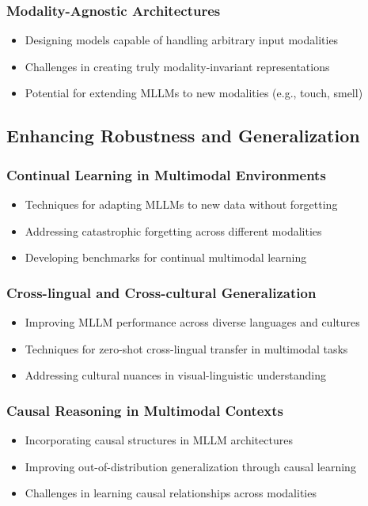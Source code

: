\subsubsection{Modality-Agnostic Architectures}
\begin{itemize}
    \item Designing models capable of handling arbitrary input modalities
    \item Challenges in creating truly modality-invariant representations
    \item Potential for extending MLLMs to new modalities (e.g., touch, smell)
\end{itemize}

\subsection{Enhancing Robustness and Generalization}
\subsubsection{Continual Learning in Multimodal Environments}
\begin{itemize}
    \item Techniques for adapting MLLMs to new data without forgetting
    \item Addressing catastrophic forgetting across different modalities
    \item Developing benchmarks for continual multimodal learning
\end{itemize}

\subsubsection{Cross-lingual and Cross-cultural Generalization}
\begin{itemize}
    \item Improving MLLM performance across diverse languages and cultures
    \item Techniques for zero-shot cross-lingual transfer in multimodal tasks
    \item Addressing cultural nuances in visual-linguistic understanding
\end{itemize}

\subsubsection{Causal Reasoning in Multimodal Contexts}
\begin{itemize}
    \item Incorporating causal structures in MLLM architectures
    \item Improving out-of-distribution generalization through causal learning
    \item Challenges in learning causal relationships across modalities
\end{itemize}

